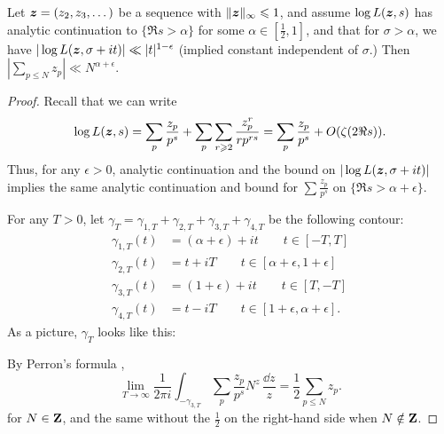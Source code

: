 \begin{theorem}\label{thm:RH->bound}
Let ${\boldsymbol z}=(z_2,z_3,\dots)$ be a sequence with $\|{\boldsymbol z}\|_\infty\leqslant 1$, and 
assume $\log L({\boldsymbol z},s)$ has analytic continuation to $\{\Re s>\alpha\}$ for some 
$\alpha\in \left[\frac 1 2,1\right]$, and that for $\sigma>\alpha$, we have 
$|\log L({\boldsymbol z},\sigma+i t)| \ll |t|^{1-\epsilon}$ (implied constant independent 
of $\sigma$.) Then $|\sum_{p\leqslant N} z_p| \ll N^{\alpha+\epsilon}$. 
\end{theorem}
\begin{proof}
Recall that we can write 
\[
	\log L({\boldsymbol z},s) = \sum_p \frac{z_p}{p^s} + \sum_p \sum_{r\geqslant 2} \frac{z_p^r}{r p^{r s}} = \sum_p \frac{z_p}{p^s} + O(\zeta(2 \Re s)) .
\]
Thus, for any $\epsilon>0$, analytic continuation and the bound on 
$|\log L({\boldsymbol z},\sigma+i t)|$ implies the same analytic continuation and bound for 
$\sum \frac{z_p}{p^s}$ on $\{\Re s>\alpha+\epsilon\}$. 

For any $T>0$, let 
$\gamma_T = \gamma_{1,T} + \gamma_{2,T} + \gamma_{3,T} + \gamma_{4,T}$ be the 
following contour: 
\begin{align*}
	\gamma_{1,T}(t) &= (\alpha+\epsilon)+i t\qquad t\in [-T,T] \\
	\gamma_{2,T}(t) &= t+i T \qquad t\in [\alpha+\epsilon,1+\epsilon] \\
	\gamma_{3,T}(t) &= (1+\epsilon) + i t \qquad t\in [T,-T] \\
	\gamma_{4,T}(t) &= t - i T \qquad t\in [1+\epsilon,\alpha+\epsilon] .
\end{align*}
As a picture, $\gamma_T$ looks like this: 
\begin{center}
\end{center}
By Perron's formula \cite[Th.~11.18]{apostol-1976}, 
\[
	\lim_{T\to \infty} \frac{1}{2\pi i} \int_{-\gamma_{3,T}} \sum_p \frac{z_p}{p^s} N^z\, \frac{\dd z}{z} = \frac 1 2 \sum_{p\leqslant N} z_p .
\]
for $N\in \mathbf{Z}$, and the same without the $\frac 1 2$ on the right-hand side 
when $N\notin \mathbf{Z}$. 


\end{proof}
